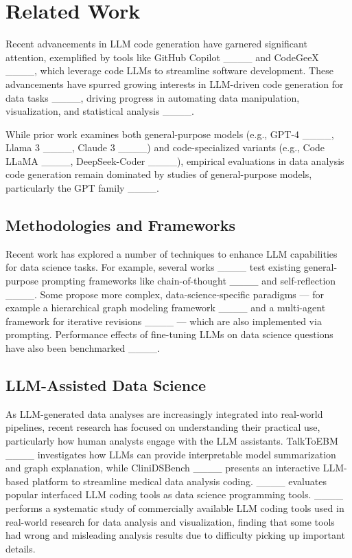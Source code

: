 \section{Related Work}
Recent advancements in LLM code generation have garnered significant attention, exemplified by tools like GitHub Copilot ____ and CodeGeeX ____, which leverage code LLMs to streamline software development. 
These advancements have spurred growing interests in LLM-driven code generation for data tasks ____, driving progress in automating data manipulation, visualization, and statistical analysis ____.

While prior work examines both general-purpose models (e.g., GPT-4 ____, Llama 3 ____, Claude 3 ____) and code-specialized variants (e.g., Code LLaMA ____, DeepSeek-Coder ____), empirical evaluations in data analysis code generation remain dominated by studies of general-purpose models, particularly the GPT family ____.

\subsection{Methodologies and Frameworks}

Recent work has explored a number of techniques to enhance LLM capabilities for data science tasks. For example, several works ____ test existing general-purpose prompting frameworks like chain-of-thought ____ and self-reflection ____. %
Some propose more complex, data-science-specific paradigms --- for example a hierarchical graph modeling framework ____ and a multi-agent framework for iterative revisions ____ --- which are also implemented via prompting. Performance effects of fine-tuning LLMs on data science questions have also been benchmarked ____.

\subsection{LLM-Assisted Data Science} 
As LLM-generated data analyses are increasingly integrated into real-world pipelines, recent research has focused on understanding their practical use, particularly how human analysts engage with the LLM assistants.
TalkToEBM ____ investigates how LLMs can provide interpretable model summarization and graph explanation, while CliniDSBench ____ 
presents an interactive LLM-based platform to streamline medical data analysis coding. ____ evaluates popular interfaced LLM coding tools as data science programming tools.
____ performs a systematic study of commercially available LLM coding tools used in real-world research for 
data analysis and visualization, finding that some tools had wrong and misleading analysis results due to difficulty picking up important details. 

